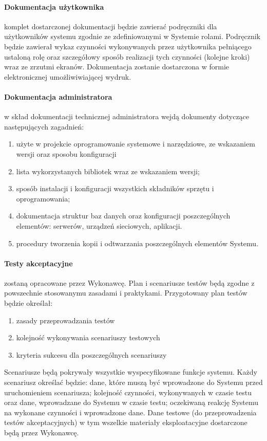\documentclass{article}
\begin{document}
\paragraph{Dokumentacja użytkownika} komplet dostarczonej dokumentacji będzie zawierać podręczniki dla użytkowników systemu zgodnie ze zdefiniowanymi w Systemie rolami. Podręcznik będzie zawierał wykaz czynności wykonywanych przez użytkownika pełniącego ustaloną rolę oraz szczegółowy sposób realizacji tych czynności (kolejne kroki) wraz ze zrzutmi ekranów. Dokumentacja zostanie dostarczona w formie elektronicznej umożliwiwiającej wydruk.
\paragraph{Dokumentacja administratora}  w skład dokumentacji technicznej administratora wejdą dokumenty dotyczące następujących zagadnień: 
\begin{enumerate}
	\item użyte w projekcie oprogramowanie systemowe i narzędziowe, ze wskazaniem wersji oraz sposobu konfiguracji
	\item lista wykorzystanych bibliotek wraz ze wskazaniem wersji; 
	\item sposób instalacji i konfiguracji wszystkich składników sprzętu i oprogramowania; 
	\item dokumentacja struktur baz danych oraz konfiguracji poszczególnych elementów: serwerów, urządzeń sieciowych, aplikacji. 
	\item procedury tworzenia kopii i odtwarzania poszczególnych elementów Systemu.
\end{enumerate}
\paragraph{Testy akceptacyjne} zostaną opracowane przez Wykonawcę. Plan i scenariusze testów będą zgodne z powszechnie stosowanymu zasadami i praktykami. Przygotowany plan testów będzie określał:
\begin{enumerate}
	\item zasady przeprowadzania testów
	\item kolejność wykonywania scenariuszy testowych
	\item kryteria sukcesu dla poszczególnych scenariuszy
\end{enumerate}
Scenariusze będą pokrywały wszystkie wyspecyfikowane funkcje systemu. Każdy scenariusz określać będzie: dane, które muszą być wprowadzone do Systemu przed uruchomieniem scenariusza; kolejność czynności, wykonywanych w czasie testu oraz dane, wprowadzane do Systemu w czasie testu; oczekiwaną reakcję Systemu na wykonane czynności i wprowadzone dane. Dane testowe (do przeprowadzenia testów akceptacyjnych) w tym wszelkie materiały eksploatacyjne dostarczone będą przez Wykonawcę. 
\end{document}
